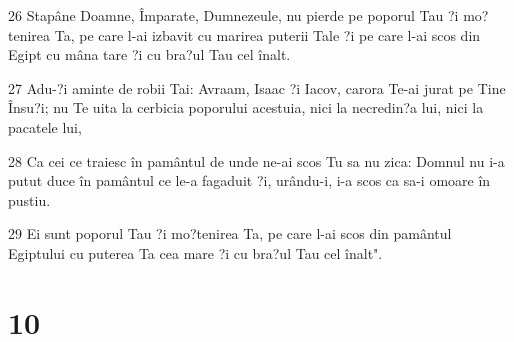 \par 26 Stapâne Doamne, Împarate, Dumnezeule, nu pierde pe poporul Tau ?i mo?tenirea Ta, pe care l-ai izbavit cu marirea puterii Tale ?i pe care l-ai scos din Egipt cu mâna tare ?i cu bra?ul Tau cel înalt.
\par 27 Adu-?i aminte de robii Tai: Avraam, Isaac ?i Iacov, carora Te-ai jurat pe Tine Însu?i; nu Te uita la cerbicia poporului acestuia, nici la necredin?a lui, nici la pacatele lui,
\par 28 Ca cei ce traiesc în pamântul de unde ne-ai scos Tu sa nu zica: Domnul nu i-a putut duce în pamântul ce le-a fagaduit ?i, urându-i, i-a scos ca sa-i omoare în pustiu.
\par 29 Ei sunt poporul Tau ?i mo?tenirea Ta, pe care l-ai scos din pamântul Egiptului cu puterea Ta cea mare ?i cu bra?ul Tau cel înalt".

\chapter{10}

